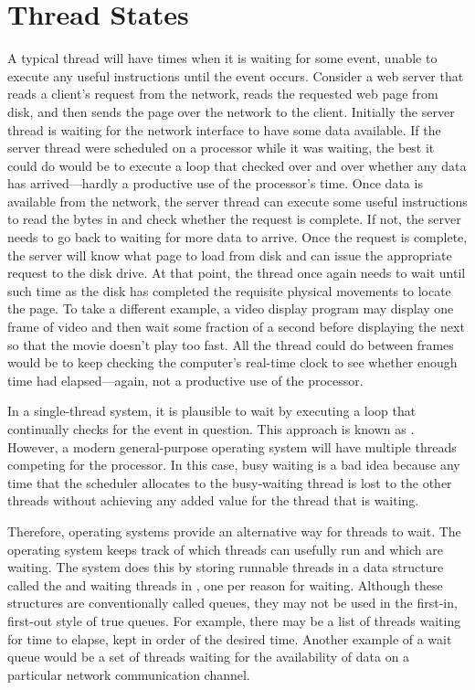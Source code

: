 \section{Thread States}\label{thread-states-section}
A typical thread will have times when it is waiting for some event,
unable to execute any useful instructions until the event occurs.
Consider a web server that reads a client's
request from the network, reads the requested web page from disk, and
then sends the page over the network to the client.  Initially the
server thread is waiting for the network interface to have some data
available.  If the server thread were scheduled on a processor while
it was waiting, the best it could do would be to execute a loop that
checked over and over whether any data has arrived---hardly a
productive use of the processor's time.  Once data is available from
the network, the server thread can execute some useful instructions to
read the bytes in and check whether the request is complete.  If not,
the server needs to go back to waiting for more data to arrive.  Once the
request is complete, the server will know what page to load from disk
and can issue the appropriate request to the disk drive.  At that
point, the thread once again needs to wait until such time as the
disk has completed the requisite physical movements to locate the
page.  To take a different example, a video display program may
display one frame of video and then wait some fraction of a second
before displaying the next so that the movie doesn't play too fast.
All the thread could do between frames would be to keep checking
the computer's real-time clock to see whether enough time had
elapsed---again, not a productive use of the processor.

In a single-thread system, it is plausible to wait by executing a loop
that continually checks for the event in question.  This approach is
known as .  However, a modern general-purpose operating
system will have multiple threads competing for the processor.  In
this case, busy waiting is a bad idea because any time that the
scheduler allocates to the busy-waiting thread is lost to the other
threads without achieving any added value for the thread that is
waiting.

Therefore, operating systems provide an alternative way for threads to
wait.
The operating system keeps track of which threads can usefully run
and which are waiting.  The system does this by storing runnable threads in a
data structure called the  and waiting threads in
, one per reason for waiting.  Although these
structures are conventionally called queues, they may not be used in
the first-in, first-out style of true queues.
For example, there may be a list of threads waiting for time to elapse, kept in order
of the desired time.  Another example of a wait queue would be a set of threads waiting for the
availability of data on a particular network communication channel.

